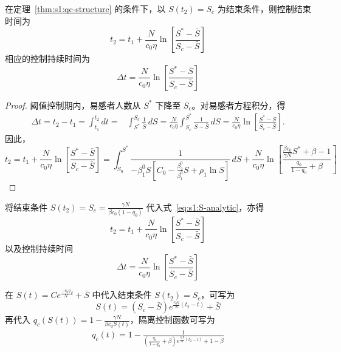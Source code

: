 \documentclass[lang=cn,a4paper,newtx]{elegantpaper}
\numberwithin{equation}{section}
\theoremstyle{plain}
\begin{document}
\begin{theorem}
    在定理~\ref{thm:s1:qc-structure} 的条件下，以 $S(t_2)=S_c$ 为结束条件，则控制结束时间为
    \begin{equation}
    t_2
    =
    t_1+
    \frac{N}{c_0 \eta}
    \ln \left[
    \frac{S^*-\bar S}
    {S_c-\bar S}
    \right]
    \label{eq:s1:t2}
    \end{equation}
    相应的控制持续时间为
        \begin{equation}
        \Delta t = \frac{N}{c_0 \eta}
        \ln \left[
        \frac{S^*-\bar S}
        {S_c-\bar S}
        \right]
    \end{equation}
\end{theorem}
\begin{proof}   
    阈值控制期内，易感者人数从 $S^*$ 下降至 $S_c$。对易感者方程积分，得
    \begin{align*}
        \Delta t=t_2-t_1=\int_{t_1}^{t_2} dt=&\int_{S^*}^{S_c} \frac{1}{\dot{S}} \, dS
        =\frac{N}{c_0\eta}\int_{S_c}^{S^*} \frac{1}{S-\bar S}\,dS
        =\frac{N}{c_0 \eta}
        \ln \left[
        \frac{S^*-\bar S}
        {S_c-\bar S}
        \right].
    \end{align*}
    因此，
    \begin{equation*}
    t_2
    =
    t_1+
    \frac{N}{c_0 \eta}
    \ln \left[
    \frac{S^*-\bar S}
    {S_c-\bar S}
    \right]=\int_{S_0}^{S^*}
    \frac{1}{
    -\beta_1^0S\left[
    C_0-\frac{\beta_2^0}{\beta_1^0}S+\rho_1\ln S
    \right]
    }\,dS + \frac{N}{c_0 \eta}
    \ln \left[
    \frac{\frac{\beta c_0}{\gamma N}S^*+ \beta-1}
    {\frac{q_0}{1-q_0}+ \beta}
    \right]
    \end{equation*}
\end{proof}

\begin{remark}
    将结束条件 $S(t_2)=S_c=\frac{\gamma N}{\beta c_0(1-q_0)}$ 代入式~\eqref{eq:s1:S-analytic}，亦得
    \begin{equation*}
     t_2= t_1+\frac{N}{c_0 \eta}
     \ln \left[
     \frac{S^*-\bar S}
     {S_c-\bar S}
     \right]
    \end{equation*}
    以及控制持续时间
    \begin{equation*}
    \Delta t = \frac{N}{c_0 \eta}
     \ln \left[
     \frac{S^*-\bar S}
     {S_c-\bar S}
     \right]
    \end{equation*}
\end{remark}
\begin{remark}
    在 $S(t)=C e^{\frac{-c_0 \eta}{N}t}+\bar S$ 中代入结束条件 $S(t_2)=S_c$，可写为
    \begin{equation*}
    S(t) = \left( S_c - \bar S \right) e^{\frac{c_0\eta}{N}(t_2 - t )} + \bar S
    \end{equation*}
    再代入 $q_c(S(t))=1-\frac{\gamma N}{\beta c_0S(t)}$，隔离控制函数可写为
    \begin{align*}
    q_c(t)=1 - \frac{1}{(\tfrac{q_0}{1-q_0}+\beta)e^{\frac{c_0\eta}{N}(t_2 - t )}+1-\beta}
    \end{align*}
\end{remark}
\end{document}
